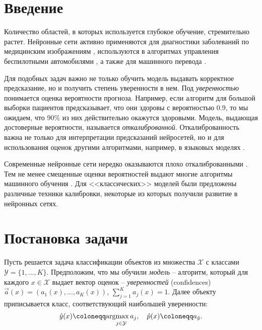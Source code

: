 \documentclass[12pt]{article}
\begin{document}
\newpage
\tableofcontents

\newpage

\section{Введение}

Количество областей, в которых используется глубокое обучение, стремительно растет. Нейронные сети активно применяются для диагностики заболеваний по медицинским изображениям \cite{medical_nn}, используются в алгоритмах управления беспилотными автомобилями \cite{self_driving}, а также для машинного перевода \cite{nmt_google}. 

Для подобных задач важно не только обучить модель выдавать корректное предсказание, но и получить степень уверенности в нем. Под \emph{уверенностью} понимается оценка вероятности прогноза. Например, если алгоритм для большой выборки пациентов предсказывает, что они здоровы с вероятностью 0.9, то мы ожидаем, что $90\%$ из них действительно окажутся здоровыми. Модель, выдающая достоверные вероятности, называется \emph{откалиброванной}. Откалиброванность важна не только для интерпретации предсказаний нейросетей, но и для использования оценок другими алгоритмами, например, в языковых моделях \cite{nn_lm}.

Современные нейронные сети нередко оказываются плохо откалиброванными \cite{on_cal}. Тем не менее смещенные оценки вероятностей выдают многие алгоритмы машинного обучения \cite{good_proba, emp_comparison}. Для <<классических>> моделей были предложены различные техники калибровки, некоторые из которых получили развитие в нейронных сетях.

\section{Постановка задачи}

Пусть решается задача классификации объектов из множества $\mathcal{X}$ с классами ${\mathcal{Y}}=\{1,\dots,K\}$. Предположим, что мы обучили \emph{модель} -- алгоритм, который для каждого $x\in{\mathcal{X}}$ выдает вектор оценок -- \emph{уверенностей} (confidences) $\vec{a}(x)=(a_1(x),\dots,a_K(x))$, $\sum_{j=1}^{K}a_j(x)=1$. Далее объекту приписывается класс, соответствующий наибольшей уверенности: 
\begin{equation*}\hat{y}(x)\coloneqq\underset{j\in \mathcal{Y}}{\argmax{a_j}},\quad \hat{p}(x)\coloneqq a_{\hat{y}}.
\end{equation*}
\end{document}
